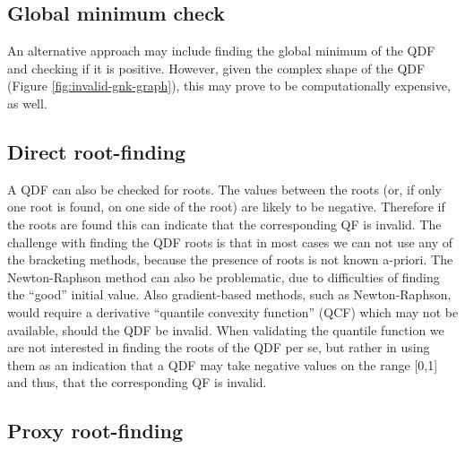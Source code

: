 \documentclass[
  12pt,
]{article}
\begin{document}
\hypertarget{global-minimum-check}{%
\subsection{Global minimum check}\label{global-minimum-check}}

An alternative approach may include finding the global minimum of the QDF and checking if it is positive. However, given the complex shape of the QDF (Figure \ref{fig:invalid-gnk-graph}), this may prove to be computationally expensive, as well.

\hypertarget{direct-root-finding}{%
\subsection{Direct root-finding}\label{direct-root-finding}}

A QDF can also be checked for roots. The values between the roots (or, if only one root is found, on one side of the root) are likely to be negative. Therefore if the roots are found this can indicate that the corresponding QF is invalid. The challenge with finding the QDF roots is that in most cases we can not use any of the bracketing methods, because the presence of roots is not known a-priori. The Newton-Raphson method can also be problematic, due to difficulties of finding the ``good'' initial value. Also gradient-based methods, such as Newton-Raphson, would require a derivative ``quantile convexity function'' (QCF) which may not be available, should the QDF be invalid. When validating the quantile function we are not interested in finding the roots of the QDF per se, but rather in using them as an indication that a QDF may take negative values on the range {[}0,1{]} and thus, that the corresponding QF is invalid.

\hypertarget{proxy-root-finding}{%
\subsection{Proxy root-finding}\label{proxy-root-finding}}
\end{document}
